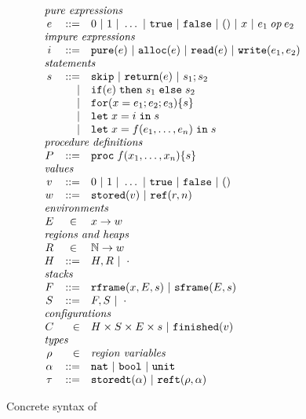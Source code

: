 \newcommand{\syntaxtitle}[1]{\multicolumn{3}{l}{\textit{#1}}}
\begin{figure}[t]

\[
\begin{array}{crl}
\syntaxtitle{pure expressions}\\
e & ::= & 0 \sep{} 1 \sep{} \ldots{} \sep{} \texttt{true} \sep{} \texttt{false} \sep{} () \sep{} x \sep{} 
          e_1 \mathbin{\mathit{op}} e_2 \\
\syntaxtitle{impure expressions}\\
i & ::= & \texttt{pure}(e) \sep{} \texttt{alloc}(e) \sep{}
          \texttt{read}(e) \sep{} \texttt{write}(e_1, e_2)\\
\syntaxtitle{statements}\\
s & ::= & \texttt{skip} \sep{} \texttt{return}(e) \sep{} s_1; s_2 \\ 
  & |   & \texttt{if}(e)\texttt{\;then\;} s_1 \texttt{\;else\;} s_2 \\
  & |   & \texttt{for}(x = e_1; e_2; e_3) \{ s \} \\
  & |   & \texttt{let\;} x = i \texttt{\;in\;} s \\
  & |   & \texttt{let\;} x = f(e_1, \ldots{}, e_n) \texttt{\;in\;} s \\
\syntaxtitle{procedure definitions}\\
P & ::= & \texttt{proc\;} f(x_1, \ldots{}, x_n) \{ s \}
\\
\syntaxtitle{values}\\
v & ::= & 0 \sep{} 1 \sep{} \ldots{} \sep{} \texttt{true} \sep{} \texttt{false} \sep{} () \\
w & ::= & \texttt{stored}(v) \sep{} \texttt{ref}(r, n) \\
\syntaxtitle{environments}\\
E & \in{} & x \to w \\
\syntaxtitle{regions and heaps}\\
R & \in{} & \mathbb{N} \to w\\
H & ::=   & H, R \sep{} \cdot{}\\
\syntaxtitle{stacks}\\
F & ::= & \texttt{rframe}(x, E, s) \sep{} \texttt{sframe}(E, s) \\
S & ::= & F, S \sep{} \cdot{} \\
\syntaxtitle{configurations}\\
C & \in & H \times S \times E \times s \sep{} \texttt{finished}(v) \\
\syntaxtitle{types}\\
\rho   & \in & \textit{region variables}\\
\alpha & ::= & \texttt{nat} \sep{} \texttt{bool} \sep{} \texttt{unit} \\
\tau   & ::= & \texttt{storedt}(\alpha) \sep{} \texttt{reft}(\rho, \alpha)
\end{array}
\]


\label{fig:syntax}
\caption{Concrete syntax of \coreivory{}}
\end{figure}

